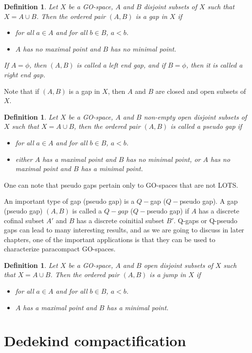 \documentclass[12pt,oneside,english]{amsbook}
\numberwithin{equation}{section} %
\numberwithin{figure}{section} %
\theoremstyle{plain}
\numberwithin{section}{chapter}
\theoremstyle{plain}
\newtheorem{defn}[thm]{Definition}
\begin{document}
\begin{defn}
  Let $X$ be a GO-space, $A$ and $B$ disjoint subsets of $X$ such that $X = A \cup B$. Then the ordered pair $(A,B)$ is a gap in $X$ if
  \begin{itemize}
  \item for all $a \in A$ and for all $b \in B$, $a < b$.
  \item $A$ has no maximal point and $B$ has no minimal point.
  \end{itemize}
  If $A = \phi$, then $(A,B)$ is called a left end gap, and if $B = \phi$, then it is called a right end gap. 
\end{defn}
Note that if $(A,B)$ is a gap in $X$, then $A$ and $B$ are closed and open subsets of $X$.
\begin{defn}
  Let $X$ be a GO-space, $A$ and $B$ non-empty open disjoint subsets of $X$ such that $X = A \cup B$, then the ordered pair $(A,B)$ is called a pseudo gap if
  \begin{itemize}
  \item for all $a \in A$ and for all $b \in B$, $a < b$.
  \item either $A$ has a maximal point and $B$ has no minimal point, or $A$ has no maximal point and $B$ has a minimal point.
  \end{itemize}
\end{defn}
One can note that pseudo gaps pertain only to GO-spaces that are not LOTS.

An important type of gap (pseudo gap) is a $Q-$gap ($Q-$pseudo gap). A gap (pseudo gap) $(A,B)$ is called a $Q-gap$ ($Q-$pseudo gap) if $A$ has a discrete cofinal subset $A'$ and $B$ has a discrete coinitial subset $B'$. Q-gaps or Q-pseudo gaps can lead to many interesting results, and as we are going to discuss in later chapters, one of the important applications is that they can be used to characterize paracompact GO-spaces.

\begin{defn}
  Let $X$ be a GO-space, $A$ and $B$ open disjoint subsets of $X$ such that $X = A \cup B$. Then the ordered pair $(A,B)$ is a jump in $X$ if
  \begin{itemize}
  \item for all $a \in A$ and for all $b \in B$, $a < b$.
  \item $A$ has a maximal point and $B$ has a minimal point.
  \end{itemize}
\end{defn}


\section{Dedekind compactification}
\end{document}
